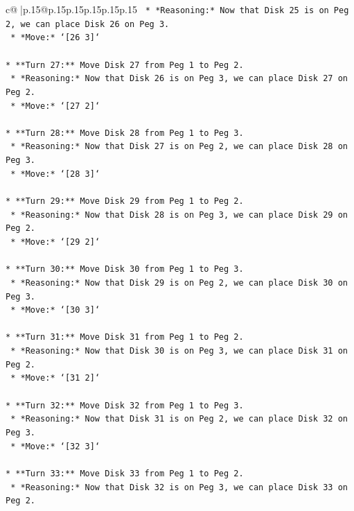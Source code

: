\documentclass{article}
\begin{document}
{\begin{supertabular}{c@{$\;$}|p{.15\linewidth}@{}p{.15\linewidth}p{.15\linewidth}p{.15\linewidth}p{.15\linewidth}p{.15\linewidth}}
{{{\texttt{    *   *Reasoning:* Now that Disk 25 is on Peg 2, we can place Disk 26 on Peg 3.} \\
\texttt{    *   *Move:* `{[}26 3{]}`} \\
\\ 
\texttt{*   **Turn 27:** Move Disk 27 from Peg 1 to Peg 2.} \\
\texttt{    *   *Reasoning:* Now that Disk 26 is on Peg 3, we can place Disk 27 on Peg 2.} \\
\texttt{    *   *Move:* `{[}27 2{]}`} \\
\\ 
\texttt{*   **Turn 28:** Move Disk 28 from Peg 1 to Peg 3.} \\
\texttt{    *   *Reasoning:* Now that Disk 27 is on Peg 2, we can place Disk 28 on Peg 3.} \\
\texttt{    *   *Move:* `{[}28 3{]}`} \\
\\ 
\texttt{*   **Turn 29:** Move Disk 29 from Peg 1 to Peg 2.} \\
\texttt{    *   *Reasoning:* Now that Disk 28 is on Peg 3, we can place Disk 29 on Peg 2.} \\
\texttt{    *   *Move:* `{[}29 2{]}`} \\
\\ 
\texttt{*   **Turn 30:** Move Disk 30 from Peg 1 to Peg 3.} \\
\texttt{    *   *Reasoning:* Now that Disk 29 is on Peg 2, we can place Disk 30 on Peg 3.} \\
\texttt{    *   *Move:* `{[}30 3{]}`} \\
\\ 
\texttt{*   **Turn 31:** Move Disk 31 from Peg 1 to Peg 2.} \\
\texttt{    *   *Reasoning:* Now that Disk 30 is on Peg 3, we can place Disk 31 on Peg 2.} \\
\texttt{    *   *Move:* `{[}31 2{]}`} \\
\\ 
\texttt{*   **Turn 32:** Move Disk 32 from Peg 1 to Peg 3.} \\
\texttt{    *   *Reasoning:* Now that Disk 31 is on Peg 2, we can place Disk 32 on Peg 3.} \\
\texttt{    *   *Move:* `{[}32 3{]}`} \\
\\ 
\texttt{*   **Turn 33:** Move Disk 33 from Peg 1 to Peg 2.} \\
\texttt{    *   *Reasoning:* Now that Disk 32 is on Peg 3, we can place Disk 33 on Peg 2.} \\
}}}
\end{supertabular}}
\end{document}
